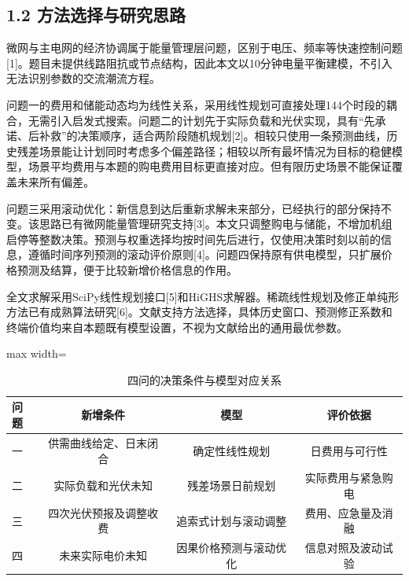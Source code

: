 \documentclass[UTF8,a4paper,zihao=-4,fontset=windows]{ctexart}
\begin{document}
\subsection{1.2 方法选择与研究思路}
微网与主电网的经济协调属于能量管理层问题，区别于电压、频率等快速控制问题[1]。题目未提供线路阻抗或节点结构，因此本文以10分钟电量平衡建模，不引入无法识别参数的交流潮流方程。
\par
问题一的费用和储能动态均为线性关系，采用线性规划可直接处理144个时段的耦合，无需引入启发式搜索。问题二的计划先于实际负载和光伏实现，具有“先承诺、后补救”的决策顺序，适合两阶段随机规划[2]。相较只使用一条预测曲线，历史残差场景能让计划同时考虑多个偏差路径；相较以所有最坏情况为目标的稳健模型，场景平均费用与本题的购电费用目标更直接对应。但有限历史场景不能保证覆盖未来所有偏差。
\par
问题三采用滚动优化：新信息到达后重新求解未来部分，已经执行的部分保持不变。该思路已有微网能量管理研究支持[3]。本文只调整购电与储能，不增加机组启停等整数决策。预测与权重选择均按时间先后进行，仅使用决策时刻以前的信息，遵循时间序列预测的滚动评价原则[4]。问题四保持原有供电模型，只扩展价格预测及结算，便于比较新增价格信息的作用。
\par
全文求解采用SciPy线性规划接口[5]和HiGHS求解器。稀疏线性规划及修正单纯形方法已有成熟算法研究[6]。文献支持方法选择，具体历史窗口、预测修正系数和终端价值均来自本题既有模型设置，不视为文献给出的通用最优参数。
\par
\begin{table}[H]\centering\caption{四问的决策条件与模型对应关系}
\fontsize{9.5}{12}\selectfont\setlength{\tabcolsep}{4pt}\renewcommand{\arraystretch}{1.12}
\begin{adjustbox}{max width=\linewidth}\begin{tabular}{lccc}\toprule
问题 & 新增条件 & 模型 & 评价依据\\\midrule
一 & 供需曲线给定、日末闭合 & 确定性线性规划 & 日费用与可行性\\
二 & 实际负载和光伏未知 & 残差场景日前规划 & 实际费用与紧急购电\\
三 & 四次光伏预报及调整收费 & 追索式计划与滚动调整 & 费用、应急量及消融\\
四 & 未来实际电价未知 & 因果价格预测与滚动优化 & 信息对照及波动试验\\
\bottomrule\end{tabular}\end{adjustbox}\end{table}
\end{document}
